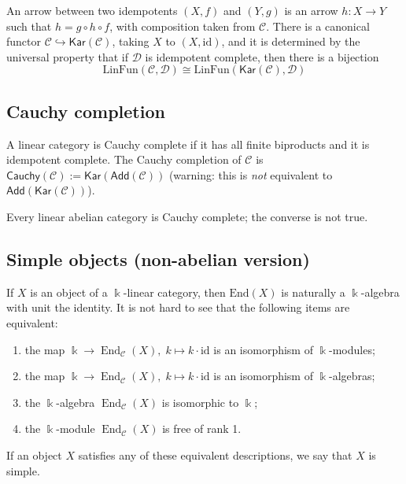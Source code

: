 \documentclass[11pt]{article}
\theoremstyle{definition}
\begin{document}
An arrow between two idempotents $(X,f)$ and $(Y,g)$ is an arrow $h: X \to Y$ such that $h = g \circ h \circ f$, with composition taken from $\mathcal{C}$. There is a canonical functor $\mathcal{C} \hookrightarrow \mathsf{Kar}(\mathcal{C})$, taking $X$ to $(X, \mathrm{id})$, and it is determined by the universal property that if $\mathcal{D}$ is idempotent complete, then there is a bijection
\[
\mathrm{LinFun}(\mathcal{C}, \mathcal{D}) \cong \mathrm{LinFun}(\mathsf{Kar}(\mathcal{C}), \mathcal{D})
\]

\subsection{Cauchy completion}
A linear category is Cauchy complete if it has all finite biproducts and it is idempotent complete. The Cauchy completion of $\mathcal{C}$ is $\mathsf{Cauchy}(\mathcal{C}) := \mathsf{Kar}(\mathsf{Add}(\mathcal{C}))$ (warning: this is \emph{not} equivalent to $\mathsf{Add}(\mathsf{Kar}(\mathcal{C}))$).

Every linear abelian category is Cauchy complete; the converse is not true.

\subsection{Simple objects (non-abelian version)}
If $X$ is an object of a $\Bbbk$-linear category, then $\mathrm{End}(X)$ is naturally a $\Bbbk$-algebra with
unit the identity. It is not hard to see that the following items are equivalent:
\begin{enumerate}[label=(\roman*)]
    \item the map $\Bbbk \to \operatorname{End}_{\mathcal{C}}(X),\; k \mapsto k \cdot \mathrm{id}$ is an isomorphism of $\Bbbk$-modules;
    \item the map $\Bbbk \to \operatorname{End}_{\mathcal{C}}(X),\; k \mapsto k \cdot \mathrm{id}$ is an isomorphism of $\Bbbk$-algebras;
    \item the $\Bbbk$-algebra $\operatorname{End}_{\mathcal{C}}(X)$ is isomorphic to $\Bbbk$;
    \item the $\Bbbk$-module $\operatorname{End}_{\mathcal{C}}(X)$ is free of rank 1.
\end{enumerate}
If an object $X$ satisfies any of these equivalent descriptions, we say that $X$ is simple.
\end{document}
